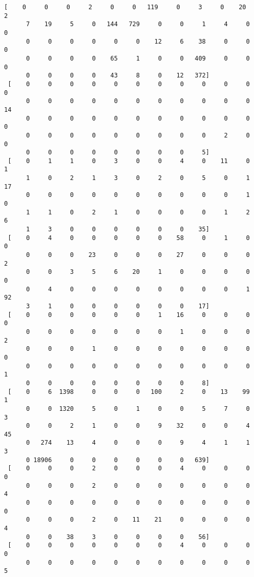 \documentclass[11pt]{article}
\begin{document}
\begin{Verbatim}[commandchars=\\\{\}]
 [    0     0     0     2     0     0   119     0     3     0    20     2
      7    19     5     0   144   729     0     0     1     4     0     0
      0     0     0     0     0     0    12     6    38     0     0     0
      0     0     0     0    65     1     0     0   409     0     0     0
      0     0     0     0    43     8     0    12   372]
 [    0     0     0     0     0     0     0     0     0     0     0     0
      0     0     0     0     0     0     0     0     0     0     0    14
      0     0     0     0     0     0     0     0     0     0     0     0
      0     0     0     0     0     0     0     0     0     2     0     0
      0     0     0     0     0     0     0     0     5]
 [    0     1     1     0     3     0     0     4     0    11     0     1
      1     0     2     1     3     0     2     0     5     0     1    17
      0     0     0     0     0     0     0     0     0     0     1     0
      1     1     0     2     1     0     0     0     0     1     2     6
      1     3     0     0     0     0     0     0    35]
 [    0     4     0     0     0     0     0    58     0     1     0     0
      0     0     0    23     0     0     0    27     0     0     0     2
      0     0     3     5     6    20     1     0     0     0     0     0
      0     4     0     0     0     0     0     0     0     0     1    92
      3     1     0     0     0     0     0     0    17]
 [    0     0     0     0     0     0     1    16     0     0     0     0
      0     0     0     0     0     0     0     1     0     0     0     2
      0     0     0     1     0     0     0     0     0     0     0     0
      0     0     0     0     0     0     0     0     0     0     0     1
      0     0     0     0     0     0     0     0     8]
 [    0     6  1398     0     0     0   100     2     0    13    99     1
      0     0  1320     5     0     1     0     0     5     7     0     3
      0     0     2     1     0     0     9    32     0     0     4    45
      0   274    13     4     0     0     0     9     4     1     1     3
      0 18906     0     0     0     0     0     0   639]
 [    0     0     0     2     0     0     0     4     0     0     0     0
      0     0     0     2     0     0     0     0     0     0     0     4
      0     0     0     0     0     0     0     0     0     0     0     0
      0     0     0     2     0    11    21     0     0     0     0     4
      0     0    38     3     0     0     0     0    56]
 [    0     0     0     0     0     0     0     4     0     0     0     0
      0     0     0     0     0     0     0     0     0     0     0     5

\end{Verbatim}
\end{document}
